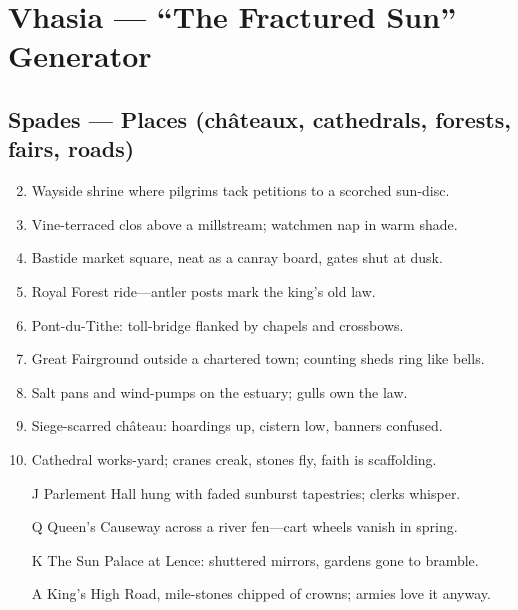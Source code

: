 \chapter{Vhasia --- ``The Fractured Sun'' Generator}
\label{chap:vhasia}

\section*{Spades --- Places (châteaux, cathedrals, forests, fairs, roads)}
\label{sec:vhasia-places}
\begin{enumerate}
\setcounter{enumi}{1}
\item Wayside shrine where pilgrims tack petitions to a scorched sun-disc.
\item Vine-terraced clos above a millstream; watchmen nap in warm shade.
\item Bastide market square, neat as a canray board, gates shut at dusk.
\item Royal Forest ride---antler posts mark the king's old law.
\item Pont-du-Tithe: toll-bridge flanked by chapels and crossbows.
\item Great Fairground outside a chartered town; counting sheds ring like bells.
\item Salt pans and wind-pumps on the estuary; gulls own the law.
\item Siege-scarred château: hoardings up, cistern low, banners confused.
\item Cathedral works-yard; cranes creak, stones fly, faith is scaffolding.
\item[J] Parlement Hall hung with faded sunburst tapestries; clerks whisper.
\item[Q] Queen's Causeway across a river fen---cart wheels vanish in spring.
\item[K] The Sun Palace at Lence: shuttered mirrors, gardens gone to bramble.
\item[A] King's High Road, mile-stones chipped of crowns; armies love it anyway.
\end{enumerate}

